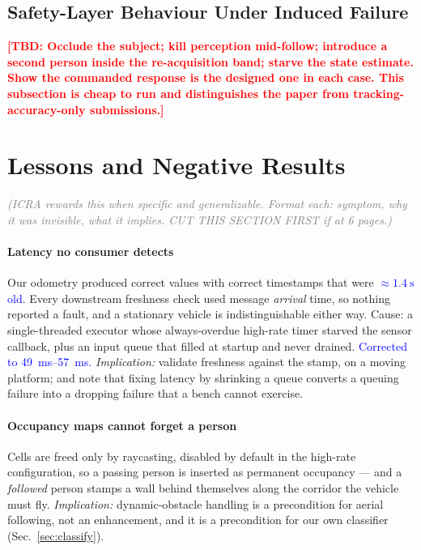 \documentclass[conference]{IEEEtran}
\newcommand{\tbd}[1]{\textcolor{red}{\textbf{[TBD: #1]}}}
\newcommand{\bench}[1]{\textcolor{blue}{#1}}
\newcommand{\note}[1]{\textcolor{gray}{\textit{(#1)}}}
\begin{document}
\subsection{Safety-Layer Behaviour Under Induced Failure}
\tbd{Occlude the subject; kill perception mid-follow; introduce a second person
inside the re-acquisition band; starve the state estimate. Show the commanded
response is the designed one in each case. This subsection is cheap to run and
distinguishes the paper from tracking-accuracy-only submissions.}

\section{Lessons and Negative Results}
\label{sec:lessons}

\note{ICRA rewards this when specific and generalizable. Format each: symptom,
why it was invisible, what it implies. CUT THIS SECTION FIRST if at 6 pages.}

\paragraph{Latency no consumer detects} Our odometry produced correct values with
correct timestamps that were \bench{${\approx}\SI{1.4}{\second}$ old}. Every
downstream freshness check used message \emph{arrival} time, so nothing reported
a fault, and a stationary vehicle is indistinguishable either way. Cause: a
single-threaded executor whose always-overdue high-rate timer starved the sensor
callback, plus an input queue that filled at startup and never drained.
\bench{Corrected to \SIrange{49}{57}{\milli\second}.} \emph{Implication:} validate
freshness against the stamp, on a moving platform; and note that fixing latency
by shrinking a queue converts a queuing failure into a dropping failure that a
bench cannot exercise.

\paragraph{Occupancy maps cannot forget a person} Cells are freed only by
raycasting, disabled by default in the high-rate configuration, so a passing
person is inserted as permanent occupancy --- and a \emph{followed} person stamps
a wall behind themselves along the corridor the vehicle must fly.
\emph{Implication:} dynamic-obstacle handling is a precondition for aerial
following, not an enhancement, and it is a precondition for our own
classifier (Sec.~\ref{sec:classify}).
\end{document}
